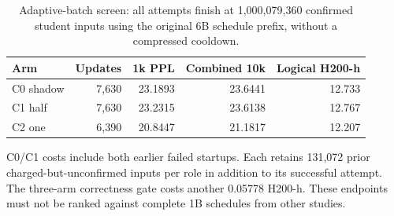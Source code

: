 \begin{table}[tbp]
\centering
\small
\caption{Adaptive-batch screen: all attempts finish at 1,000,079,360 confirmed student inputs using the original 6B schedule prefix, without a compressed cooldown.}
\label{tab:cbs}
\begin{tabular}{lrrrr}
\toprule
Arm & Updates & 1k PPL & Combined 10k & Logical H200-h \\
\midrule
C0 shadow & 7,630 & 23.1893 & 23.6441 & 12.733 \\
C1 half & 7,630 & 23.2315 & 23.6138 & 12.767 \\
C2 one & 6,390 & 20.8447 & 21.1817 & 12.207 \\
\bottomrule
\end{tabular}
\par\vspace{3pt}\begin{minipage}{\linewidth}\footnotesize C0/C1 costs include both earlier failed startups. Each retains 131,072 prior charged-but-unconfirmed inputs per role in addition to its successful attempt. The three-arm correctness gate costs another 0.05778 H200-h. These endpoints must not be ranked against complete 1B schedules from other studies.\end{minipage}
\end{table}
